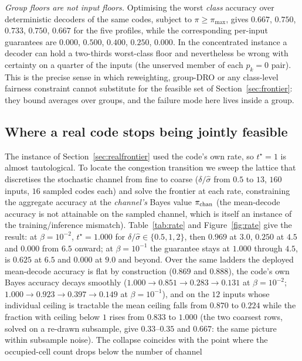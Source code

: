 \documentclass[11pt]{article}
\begin{document}
\emph{Group floors are not input floors.} Optimising the worst \emph{class} accuracy over
deterministic decoders of the same codes, subject to $\pi\ge\pi_{\max}$, gives $0.667$, $0.750$,
$0.733$, $0.750$, $0.667$ for the five profiles, while the corresponding per-input guarantees are
$0.000$, $0.500$, $0.400$, $0.250$, $0.000$. In the concentrated instance a decoder can hold a
two-thirds worst-class floor and nevertheless be wrong with certainty on a quarter of the inputs (the unserved member of each $p_k=0$ pair).
This is the precise sense in which reweighting, group-DRO
\citep{sagawa2020} or any class-level fairness constraint cannot substitute for the feasible set
of Section~\ref{sec:frontier}: they bound averages over groups, and the failure mode here lives
inside a group.

\subsection{Where a real code stops being jointly feasible}
\label{sec:rate}
The instance of Section~\ref{sec:realfrontier} used the code's own rate, so $t^\star=1$ is almost
tautological. To locate the congestion transition we sweep the lattice that discretises the
stochastic channel from fine to coarse ($\delta/\hat\sigma$ from $0.5$ to $13$, $160$ inputs,
$16$ sampled codes each) and solve the frontier at each rate, constraining the aggregate accuracy
at the \emph{channel's} Bayes value $\pi_{\rm chan}$ (the mean-decode accuracy is not attainable
on the sampled channel, which is itself an instance of the training/inference mismatch).
Table~\ref{tab:rate} and Figure~\ref{fig:rate} give the result: at $\beta=10^{-2}$, $t^\star=1.000$ for $\delta/\hat\sigma\in\{0.5,1,2\}$, then $0.969$ at
$3.0$, $0.250$ at $4.5$ and $0.000$ from $6.5$ onward; at $\beta=10^{-1}$ the guarantee stays at
$1.000$ through $4.5$, is $0.625$ at $6.5$ and $0.000$ at $9.0$ and beyond. Over the same ladders
the deployed mean-decode accuracy is flat by construction ($0.869$ and $0.888$), the code's own
Bayes accuracy decays smoothly ($1.000\to0.851\to0.283\to0.131$ at $\beta=10^{-2}$;
$1.000\to0.923\to0.397\to0.149$ at $\beta=10^{-1}$), and on the $12$ inputs whose individual
ceiling is tractable the mean ceiling falls from $0.870$ to $0.224$ while the fraction with
ceiling below $1$ rises from $0.833$ to $1.000$ (the two coarsest rows, solved on a re-drawn
subsample, give $0.33$--$0.35$ and $0.667$: the same picture within subsample noise). The
collapse coincides with the point where the occupied-cell count drops below the number of channel
\end{document}
